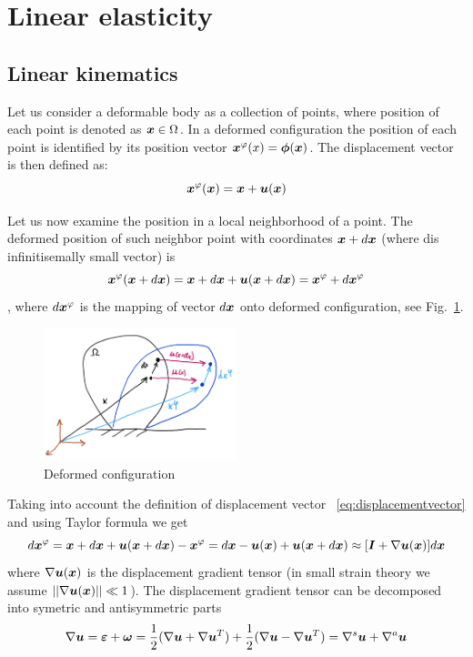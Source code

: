 \documentclass[11pt]{article}
\begin{document}
\section{Linear elasticity}
\subsection{Linear kinematics}
Let us consider a deformable body as a collection of points, where position of each point is denoted as $\x\in\Omega$. In a deformed configuration the position of each point is identified by its position vector $\xd(x) = \mbf{\phi}(\x)$. The displacement vector is then defined as:
\begin{equation}
  \label{eq:displacementvector}
  \xd(\x) = \x + \du(\x)  
\end{equation}

Let us now examine the position in a local neighborhood of a point. The deformed position of such neighbor point with coordinates $\x+d\x$ (where d\x is infinitisemally small vector) is
$$\xd(\x+d\x) = \x+d\x+\du(\x+d\x) = \xd + d\xd$$,
where $d\xd$ is the mapping of vector $d\x$ onto deformed configuration, see Fig.~\ref{fig:deformedconfiguration}.
\begin{figure}
  \begin{center}
    \includegraphics[width=0.5\textwidth]{deformedconfiguration.png}
  \end{center}
  \label{fig:deformedconfiguration}
  \caption{Deformed configuration}
\end{figure}
Taking into account the definition of displacement vector ~\ref{eq:displacementvector} and using Taylor formula we get
\begin{equation}
  d\xd = \x+d\x+\du(\x+d\x)-\xd = d\x-\du(\x)+\du(\x+d\x) \approx [\mbf{I}+\grad\du(\x)]d\x
\end{equation}
where $\grad\du(\x)$ is the displacement gradient tensor (in small strain theory we assume $\vert\vert\grad\du(\x)\vert\vert \ll 1$).
The displacement gradient tensor can be decomposed into symetric and antisymmetric parts
$$
\grad\du = \mbf{\eps}+\mbf{\omega}={1\over 2}(\grad\du+\grad\du^T)+{1\over 2}(\grad\du-\grad\du^T) = \grad^s\mbf{u}+\grad^a\mbf{u}
$$
\end{document}
